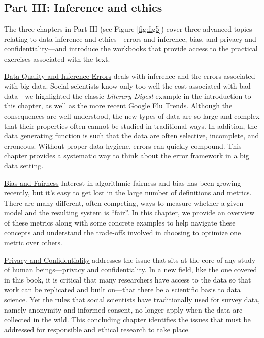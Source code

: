 \documentclass[]{krantz}
\begin{document}
\subsection{Part III: Inference and
ethics}\label{part-iii-inference-and-ethics}

The three chapters in Part III (see Figure \ref{fig:fig5}) cover three
advanced topics relating to data inference and ethics---errors and
inference, bias, and privacy and confidentiality---and introduce the
workbooks that provide access to the practical exercises associated with
the text.

\protect\hyperlink{chap:errors}{Data Quality and Inference Errors} deals
with inference and the errors associated with big data. Social
scientists know only too well the cost associated with bad data---we
highlighted the classic \emph{Literary Digest} example in the
introduction to this chapter, as well as the more recent Google Flu
Trends. Although the consequences are well understood, the new types of
data are so large and complex that their properties often cannot be
studied in traditional ways. In addition, the data generating function
is such that the data are often selective, incomplete, and erroneous.
Without proper data hygiene, errors can quickly compound. This chapter
provides a systematic way to think about the error framework in a big
data setting.

\protect\hyperlink{chap:bias}{Bias and Fairness} Interest in algorithmic
fairness and bias has been growing recently, but it's easy to get lost
in the large number of definitions and metrics. There are many
different, often competing, ways to measure whether a given model and
the resulting system is ``fair''. In this chapter, we provide an
overview of these metrics along with some concrete examples to help
navigate these concepts and understand the trade-offs involved in
choosing to optimize one metric over others.

\protect\hyperlink{chap:privacy}{Privacy and Confidentiality} addresses
the issue that sits at the core of any study of human beings---privacy
and confidentiality. In a new field, like the one covered in this book,
it is critical that many researchers have access to the data so that
work can be replicated and built on---that there be a scientific basis
to data science. Yet the rules that social scientists have traditionally
used for survey data, namely anonymity and informed consent, no longer
apply when the data are collected in the wild. This concluding chapter
identifies the issues that must be addressed for responsible and ethical
research to take place.
\end{document}
